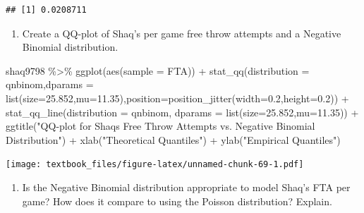 \documentclass[
  11pt,
]{book}
\newenvironment{Shaded}{\begin{snugshade}}{\end{snugshade}}
\newcommand{\AttributeTok}[1]{\textcolor[rgb]{0.77,0.63,0.00}{#1}}
\newcommand{\FloatTok}[1]{\textcolor[rgb]{0.00,0.00,0.81}{#1}}
\newcommand{\FunctionTok}[1]{\textcolor[rgb]{0.00,0.00,0.00}{#1}}
\newcommand{\NormalTok}[1]{#1}
\newcommand{\SpecialCharTok}[1]{\textcolor[rgb]{0.00,0.00,0.00}{#1}}
\newcommand{\StringTok}[1]{\textcolor[rgb]{0.31,0.60,0.02}{#1}}
\providecommand{\tightlist}{%
  \setlength{\itemsep}{0pt}\setlength{\parskip}{0pt}}
\theoremstyle{definition}
\theoremstyle{definition}
\theoremstyle{definition}
\theoremstyle{definition}
\theoremstyle{remark}
\begin{document}
\begin{verbatim}
## [1] 0.0208711
\end{verbatim}

\newpage

\begin{enumerate}
\def\labelenumi{(\alph{enumi})}
\setcounter{enumi}{4}
\tightlist
\item
  Create a QQ-plot of Shaq's per game free throw attempts and a Negative Binomial distribution.
\end{enumerate}

\begin{Shaded}
\begin{Highlighting}[]
\NormalTok{shaq9798 }\SpecialCharTok{\%\textgreater{}\%} 
  \FunctionTok{ggplot}\NormalTok{(}\FunctionTok{aes}\NormalTok{(}\AttributeTok{sample =}\NormalTok{ FTA)) }\SpecialCharTok{+}
  \FunctionTok{stat\_qq}\NormalTok{(}\AttributeTok{distribution =}\NormalTok{ qnbinom,}\AttributeTok{dparams =} \FunctionTok{list}\NormalTok{(}\AttributeTok{size=}\FloatTok{25.852}\NormalTok{,}\AttributeTok{mu=}\FloatTok{11.35}\NormalTok{),}\AttributeTok{position=}\FunctionTok{position\_jitter}\NormalTok{(}\AttributeTok{width=}\FloatTok{0.2}\NormalTok{,}\AttributeTok{height=}\FloatTok{0.2}\NormalTok{)) }\SpecialCharTok{+}
  \FunctionTok{stat\_qq\_line}\NormalTok{(}\AttributeTok{distribution =}\NormalTok{ qnbinom, }\AttributeTok{dparams =} \FunctionTok{list}\NormalTok{(}\AttributeTok{size=}\FloatTok{25.852}\NormalTok{,}\AttributeTok{mu=}\FloatTok{11.35}\NormalTok{)) }\SpecialCharTok{+}
  \FunctionTok{ggtitle}\NormalTok{(}\StringTok{"QQ{-}plot for Shaq\textquotesingle{}s Free Throw Attempts vs. Negative Binomial Distribution"}\NormalTok{) }\SpecialCharTok{+}
  \FunctionTok{xlab}\NormalTok{(}\StringTok{"Theoretical Quantiles"}\NormalTok{) }\SpecialCharTok{+}
  \FunctionTok{ylab}\NormalTok{(}\StringTok{"Empirical Quantiles"}\NormalTok{)}
\end{Highlighting}
\end{Shaded}

\texttt{[image: textbook\_files/figure-latex/unnamed-chunk-69-1.pdf]}

\begin{enumerate}
\def\labelenumi{(\alph{enumi})}
\setcounter{enumi}{5}
\tightlist
\item
  Is the Negative Binomial distribution appropriate to model Shaq's FTA per game? How does it compare to using the Poisson distribution? Explain.\\
  \strut \\
  \strut \\
  \strut \\
\end{enumerate}
\end{document}
